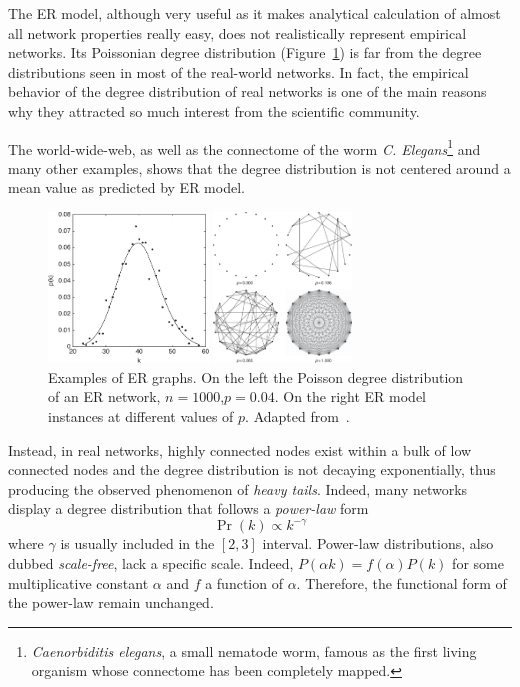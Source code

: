 The ER model, although very useful as it makes analytical calculation of almost all network properties really easy, does not realistically represent empirical networks.
Its Poissonian degree distribution (Figure~\ref{fig:deg_dist_poisson_er}) is far from the degree distributions seen in most of the real-world networks.
In fact, the empirical behavior of the degree distribution of real networks is one of the main reasons why they attracted so much interest from the scientific community.

The world-wide-web, as well as the connectome of the worm \emph{C. Elegans}\footnote{\emph{Caenorbiditis elegans}, a small nematode worm, famous as the first living organism whose connectome has been completely mapped.} and many other examples, shows that the degree distribution is not centered around a mean value as predicted by ER model. 

\begin{figure}
\centering
\begin{minipage}[b]{0.5\textwidth}\centering
\includegraphics[height=4cm]{images/deg_dist_poisson_er.pdf}
\end{minipage}\noindent
\begin{minipage}[b]{0.5\textwidth}\centering
\includegraphics[height=4cm]{images/er_graphs.pdf}
\end{minipage}
\caption{Examples of ER graphs. On the left the Poisson degree distribution of an ER network, $n=1000$,$p=0.04$. On the right ER model instances at different values of $p$. Adapted from~\cite{estrada2011}.}
\label{fig:deg_dist_poisson_er}
\end{figure}

Instead, in real networks, highly connected nodes exist within a bulk of low connected nodes and the degree distribution is not decaying exponentially, thus producing the observed phenomenon of \emph{heavy tails}. Indeed, many networks display a degree distribution that follows a \emph{power-law} form
\begin{equation}
\Pr(k) \propto k^{-\gamma}
\end{equation}
where $\gamma$ is usually included in the $[2,3]$ interval.
Power-law distributions, also dubbed \emph{scale-free}, lack a specific scale. Indeed, $P(\alpha k)=f(\alpha)P(k)$ for some multiplicative constant $\alpha$  and $f$ a function of $\alpha$. Therefore, the functional form of the power-law remain unchanged.


